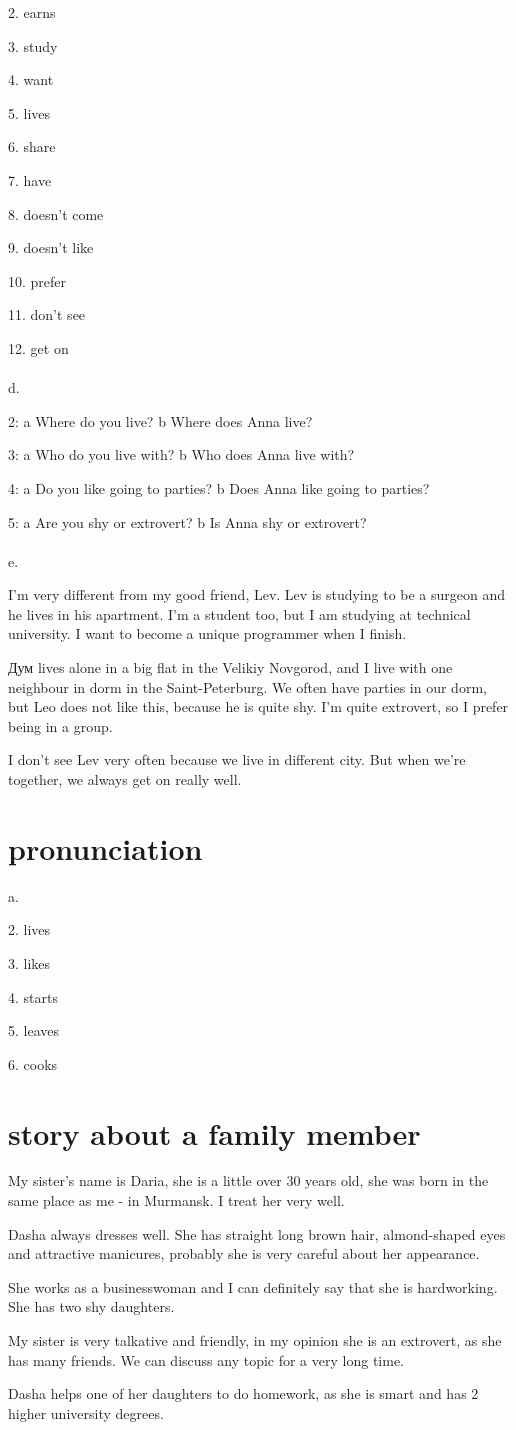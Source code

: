 \documentclass{article}
\begin{document}
2. earns

3. study

4. want

5. lives

6. share

7. have

8. doesn't come

9. doesn't like

10. prefer

11. don't see

12. get on
\\ \\
d.

2: a Where do you live? b Where does Anna live?

3: a Who do you live with? b Who does Anna live with?

4: a Do you like going to parties? b Does Anna like going to parties?

5: a Are you shy or extrovert? b Is Anna shy or extrovert?
\\ \\
e. 

I'm very different from my good friend, Lev. Lev
is studying to be a surgeon and he lives in his apartment. 
I'm a student too, but I am studying at technical university. I want
to become a unique programmer when I finish.

Дум lives alone in a big flat in
the Velikiy Novgorod, and I live with one neighbour in dorm in the Saint-Peterburg. We often have
parties in our dorm, but Leo does not like this, because he is quite shy.
I'm quite extrovert, so I prefer
being in a group. 

I don't see Lev very often because we
live in different city. But when we're together, we always get on
really well. 
\section{pronunciation}
a.

2. lives

3. likes

4. starts

5. leaves

6. cooks
\section{story about a family member}

My sister's name is Daria, she is a little over 30 years old, she was born in the same place as me - in Murmansk. I treat her very well.

Dasha always dresses well. She has straight long brown hair, almond-shaped eyes and attractive manicures, probably she is very careful about her appearance.

She works as a businesswoman and I can definitely say that she is hardworking. She has two shy daughters.

My sister is very talkative and friendly, in my opinion she is an extrovert, as she has many friends. We can discuss any topic for a very long time.

Dasha helps one of her daughters to do homework, as she is smart and has 2 higher university degrees.
\end{document}
